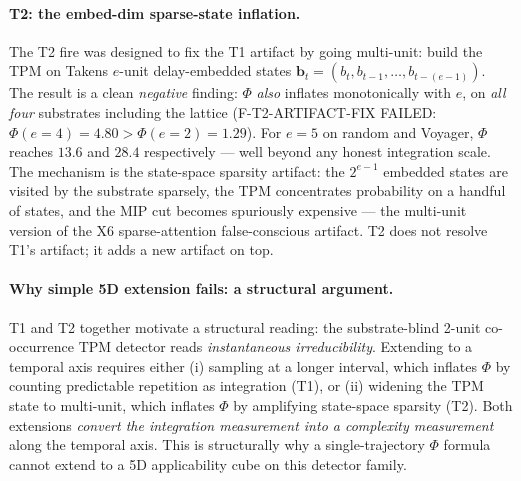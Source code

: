 \documentclass[11pt,a4paper]{article}
\begin{document}
\paragraph{T2: the embed-dim sparse-state inflation.}
The T2 fire was designed to fix the T1 artifact by going multi-unit:
build the TPM on Takens $e$-unit delay-embedded states $\mathbf{b}_t =
(b_t, b_{t-1}, \dots, b_{t-(e-1)})$. The result is a clean
\emph{negative} finding: $\Phi$ \emph{also} inflates monotonically with
$e$, on \emph{all four} substrates including the lattice
(F-T2-ARTIFACT-FIX FAILED: $\Phi(e=4) = 4.80 > \Phi(e=2) = 1.29$).
For $e=5$ on random and Voyager, $\Phi$ reaches $13.6$ and $28.4$
respectively --- well beyond any honest integration scale. The
mechanism is the state-space sparsity artifact: the $2^{e-1}$
embedded states are visited by the substrate sparsely, the TPM
concentrates probability on a handful of states, and the MIP cut
becomes spuriously expensive --- the multi-unit version of the X6
sparse-attention false-conscious artifact. T2 does not resolve T1's
artifact; it adds a new artifact on top.

\paragraph{Why simple 5D extension fails: a structural argument.}
T1 and T2 together motivate a structural reading: the substrate-blind
2-unit co-occurrence TPM detector reads \emph{instantaneous
irreducibility}. Extending to a temporal axis requires either
(i) sampling at a longer interval, which inflates $\Phi$ by counting
predictable repetition as integration (T1), or
(ii) widening the TPM state to multi-unit, which inflates $\Phi$
by amplifying state-space sparsity (T2). Both extensions \emph{convert
the integration measurement into a complexity measurement} along the
temporal axis. This is structurally why a single-trajectory $\Phi$
formula cannot extend to a 5D applicability cube on this detector
family.
\end{document}
